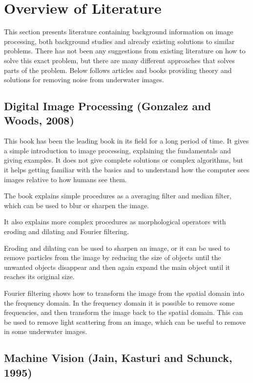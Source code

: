 \section{Overview of Literature}\label{overview}
This section presents literature containing background information on image processing, both background studies and already existing solutions to similar problems. There has not been any suggestions from existing literature on how to solve this exact problem, but there are many different approaches that solves parts of the problem.
Below follows articles and books providing theory and solutions for removing noise from underwater images.

\subsection{Digital Image Processing (Gonzalez and Woods, 2008)}
This book has been the leading book in its field for a long period of time. It gives a simple introduction to image processing, explaining the fundamentals and giving examples. It does not give complete solutions or complex algorithms, but it helps getting familiar with the basics and to understand how the computer sees images relative to how humans see them.

The book explains simple procedures as a averaging filter and median filter, which can be used to blur or sharpen the image. 

It also explains more complex procedures as morphological operators with eroding and dilating and Fourier filtering. 

Eroding and dilating can be used to sharpen an image, or it can be used to remove particles from the image by reducing the size of objects until the unwanted objects disappear and then again expand the main object until it reaches its original size. 

Fourier filtering shows how to transform the image from the spatial domain into the frequency domain. In the frequency domain it is possible to remove some frequencies, and then transform the image back to the spatial domain. This can be used to remove light scattering from an image, which can be useful to remove in some underwater images.

\subsection{Machine Vision (Jain, Kasturi and Schunck, 1995)}

